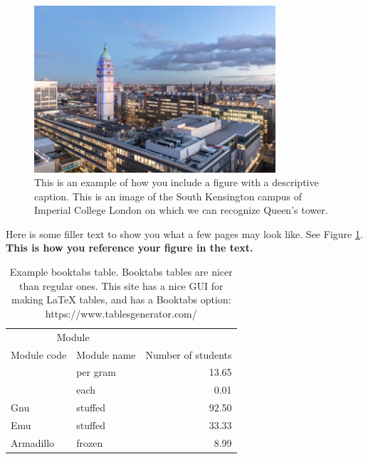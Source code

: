\documentclass[a4paper,11pt, titlepage]{article}
\theoremstyle{definition}
\theoremstyle{plain}
\theoremstyle{remark}
\begin{document}
\begin{figure}[b!] %
    \centering
    \includegraphics[width=0.8\textwidth]{figures/imperial.jpg}
    \caption{This is an example of how you include a figure with a descriptive caption. This is an image of the South Kensington campus of Imperial College London on which we can recognize Queen's tower.}
    \label{fig:imperial-picture}
\end{figure}

Here is some filler text to show you what a few pages may look like. \lipsum[2-4] See Figure \ref{fig:imperial-picture}. \textbf{This is how you reference your figure in the text.}

\begin{table}[]
    \centering
    \begin{tabular}{llr}  
        \toprule
        \multicolumn{2}{c}{Module} \\
        \cmidrule(r){1-2}
        Module code    & Module name & Number of students \\
        \midrule
              & per gram    & 13.65      \\
                      &    each     & 0.01       \\
        Gnu       & stuffed     & 92.50      \\
        Emu       & stuffed     & 33.33      \\
        Armadillo & frozen      & 8.99       \\
        \bottomrule
    \end{tabular}
    \caption{Example booktabs table. Booktabs tables are nicer than regular ones. This site has a nice GUI for making LaTeX tables, and has a Booktabs option: https://www.tablesgenerator.com/}
    \label{tab:my_label}
\end{table}
\end{document}
